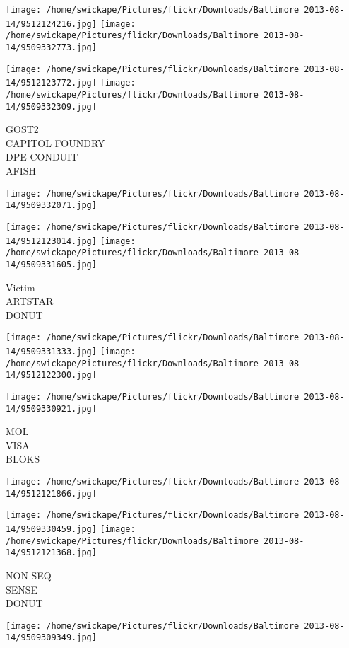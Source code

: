 \documentclass[10pt,letterpaper]{article}
\begin{document}
\texttt{[image: /home/swickape/Pictures/flickr/Downloads/Baltimore 2013-08-14/9512124216.jpg]}
\texttt{[image: /home/swickape/Pictures/flickr/Downloads/Baltimore 2013-08-14/9509332773.jpg]}

\texttt{[image: /home/swickape/Pictures/flickr/Downloads/Baltimore 2013-08-14/9512123772.jpg]}
\texttt{[image: /home/swickape/Pictures/flickr/Downloads/Baltimore 2013-08-14/9509332309.jpg]}

GOST2\\
CAPITOL FOUNDRY\\
DPE CONDUIT\\
AFISH
\pagebreak

\texttt{[image: /home/swickape/Pictures/flickr/Downloads/Baltimore 2013-08-14/9509332071.jpg]}

\vspace{0.25in}
\texttt{[image: /home/swickape/Pictures/flickr/Downloads/Baltimore 2013-08-14/9512123014.jpg]}
\texttt{[image: /home/swickape/Pictures/flickr/Downloads/Baltimore 2013-08-14/9509331605.jpg]}

Victim\\
ARTSTAR\\
DONUT
\pagebreak

\texttt{[image: /home/swickape/Pictures/flickr/Downloads/Baltimore 2013-08-14/9509331333.jpg]}
\texttt{[image: /home/swickape/Pictures/flickr/Downloads/Baltimore 2013-08-14/9512122300.jpg]}

\texttt{[image: /home/swickape/Pictures/flickr/Downloads/Baltimore 2013-08-14/9509330921.jpg]}

MOL\\
VISA\\
BLOKS
\pagebreak

\texttt{[image: /home/swickape/Pictures/flickr/Downloads/Baltimore 2013-08-14/9512121866.jpg]}

\vspace{0.25in}
\texttt{[image: /home/swickape/Pictures/flickr/Downloads/Baltimore 2013-08-14/9509330459.jpg]}
\texttt{[image: /home/swickape/Pictures/flickr/Downloads/Baltimore 2013-08-14/9512121368.jpg]}

NON SEQ\\
SENSE\\
DONUT
\pagebreak

\texttt{[image: /home/swickape/Pictures/flickr/Downloads/Baltimore 2013-08-14/9509309349.jpg]}
\end{document}
